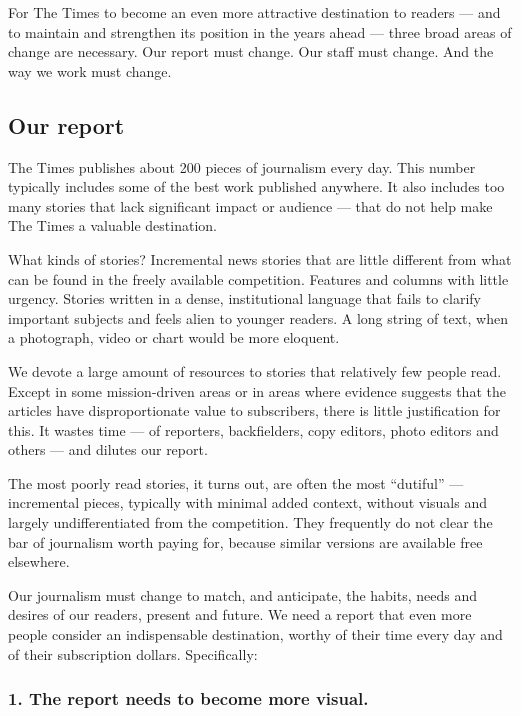 For The Times to become an even more attractive destination to readers
--- and to maintain and strengthen its position in the years ahead ---
three broad areas of change are necessary. Our report must change. Our
staff must change. And the way we work must change.

\hypertarget{our-report}{%
\subsection{Our report}\label{our-report}}

The Times publishes about 200 pieces of journalism every day. This
number typically includes some of the best work published anywhere. It
also includes too many stories that lack significant impact or audience
--- that do not help make The Times a valuable destination.

What kinds of stories? Incremental news stories that are little
different from what can be found in the freely available competition.
Features and columns with little urgency. Stories written in a dense,
institutional language that fails to clarify important subjects and
feels alien to younger readers. A long string of text, when a
photograph, video or chart would be more eloquent.

We devote a large amount of resources to stories that relatively few
people read. Except in some mission-driven areas or in areas where
evidence suggests that the articles have disproportionate value to
subscribers, there is little justification for this. It wastes time ---
of reporters, backfielders, copy editors, photo editors and others ---
and dilutes our report.

The most poorly read stories, it turns out, are often the most
``dutiful'' --- incremental pieces, typically with minimal added
context, without visuals and largely undifferentiated from the
competition. They frequently do not clear the bar of journalism worth
paying for, because similar versions are available free elsewhere.

Our journalism must change to match, and anticipate, the habits, needs
and desires of our readers, present and future. We need a report that
even more people consider an indispensable destination, worthy of their
time every day and of their subscription dollars. Specifically:

\hypertarget{1-the-report-needs-to-become-more-visual}{%
\subsubsection{1. The report needs to become more
visual.}\label{1-the-report-needs-to-become-more-visual}}

